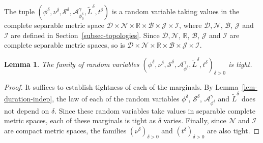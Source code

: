 \documentclass[a4paper]{article}
\numberwithin{equation}{section}
\newcommand{\wt}{\widetilde}
\newcommand{\R}{\mathbb{R}}
\newcommand{\cA}{\mathcal{A}}
\newcommand{\cB}{\mathcal{B}}
\newcommand{\cD}{\mathcal{D}}
\newcommand{\qduration}{\mathcal{S}}
\newtheorem{lemma}[theorem]{Lemma}
\theoremstyle{remark}
\numberwithin{equation}{section}
\begin{document}
The tuple $(\phi^\delta, \nu^\delta, \qduration^\delta, \cA^\gamma_{\phi_0^\delta}, \tilde L^\delta,  t^\delta)$ is a random variable taking values in the complete separable metric space $\mathcal{D} \times \mathcal{N}\times \R \times \mathcal{B} \times \mathcal J \times \mathcal I$, where $\cD, \mathcal N$, $\cB$, $\mathcal J$ and $\mathcal I$ are defined in Section~\ref{subsec-topologies}. Since $\cD, \mathcal N$, $\R$,  $\cB$, $\mathcal J$ and $\mathcal I$ are complete separable metric spaces, so is $\mathcal{D} \times \mathcal{N}\times \R \times \mathcal{B} \times \mathcal J \times \mathcal I$.



\begin{lemma}\label{lem-tight-sf}
The family of random variables $(\phi^\delta, \nu^\delta, \qduration^\delta, \cA^\gamma_{\phi^\delta}, \tilde L^\delta,  t^\delta)_{\delta > 0}$ is tight.
\end{lemma}
\begin{proof}
    It suffices to establish tightness of each of the marginals. By Lemma~\ref{lem-duration-indep}, the law of each of the random variables $\phi^\delta$, $\qduration^\delta$, $\cA^\gamma_{\phi^\delta}$ and $\wt L^\delta$ does not depend on $\delta$. Since these random variables take values in separable complete metric spaces, each of these marginals is tight as $\delta$ varies. Finally, since $\mathcal N$ and $\mathcal I$ are compact metric spaces, the families $(\nu^\delta)_{\delta > 0}$ and $(t^\delta)_{\delta>0}$ are also tight.
\end{proof}
\end{document}
